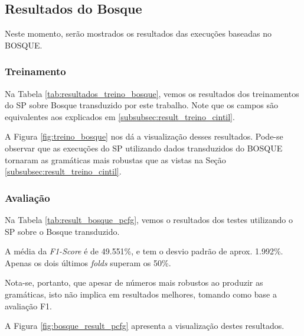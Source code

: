 \subsection{Resultados do Bosque}
\label{subsec:resultados_bosque}
Neste momento, serão mostrados os resultados das execuções baseadas no BOSQUE.

\subsubsection{Treinamento} 
\label{subsubsec:result_treino_bosque}
Na Tabela \ref{tab:resultados_treino_bosque}, vemos os resultados dos treinamentos do SP sobre Bosque transduzido por este trabalho. Note que os campos são equivalentes aos explicados em \ref{subsubsec:result_treino_cintil}.
\begin{center}
    
\end{center}

A Figura \ref{fig:treino_bosque} nos dá a visualização desses resultados. Pode-se observar que as execuções do SP utilizando dados transduzidos do BOSQUE tornaram as gramáticas mais robustas que as vistas na Seção \ref{subsubsec:result_treino_cintil}.
\begin{center}
    
\end{center}

\subsubsection{Avaliação} 
\label{subsubsec:result_aval_bosque}
Na Tabela \ref{tab:result_bosque_pcfg}, vemos o resultados dos testes utilizando o SP sobre o Bosque transduzido.
\begin{center}
    
\end{center}

A média da \textit{F1-Score} é de 49.551\%, e tem o desvio padrão de aprox. 1.992\%.
Apenas os dois últimos \textit{folds} superam os 50\%.

Nota-se, portanto, que apesar de números mais robustos ao produzir as gramáticas, isto não implica em resultados melhores, tomando como base a avaliação F1.

A Figura \ref{fig:bosque_result_pcfg} apresenta a visualização destes resultados.
\begin{center}
    
\end{center}


